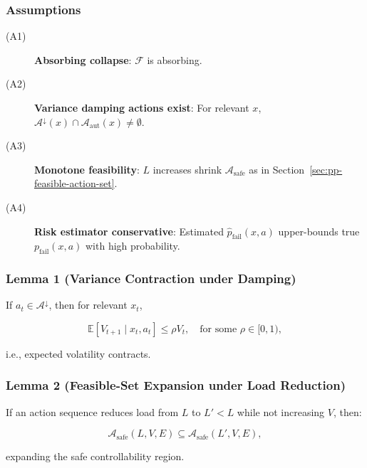 \subsubsection{Assumptions}
\label{sec:pp-assumptions}

\begin{description}
\item[(A1)] \textbf{Absorbing collapse}: $\mathcal{F}$ is absorbing.
\item[(A2)] \textbf{Variance damping actions exist}: For relevant
$x$, $\mathcal{A}^{\downarrow}(x) \cap
\mathcal{A}_{\mathrm{aut}}(x) \ne \emptyset$.
\item[(A3)] \textbf{Monotone feasibility}: $L$ increases shrink
$\mathcal{A}_{\mathrm{safe}}$ as in
Section~\ref{sec:pp-feasible-action-set}.
\item[(A4)] \textbf{Risk estimator conservative}: Estimated
$\widehat{p}_{\mathrm{fail}}(x, a)$ upper-bounds true
$p_{\mathrm{fail}}(x, a)$ with high probability.
\end{description}

\subsubsection{Lemma 1 (Variance Contraction under Damping)}
\label{sec:pp-lemma-1}

\begin{lemma}
\label{lem:pp-variance-contraction}
If $a_t \in \mathcal{A}^{\downarrow}$, then for relevant $x_t$,

\begin{equation}
\mathbb{E}[V_{t+1} \mid x_t, a_t] \le \rho V_t,
\quad \text{for some } \rho \in [0, 1),
\end{equation}

\noindent
i.e., expected volatility contracts.
\end{lemma}

\subsubsection{Lemma 2 (Feasible-Set Expansion under Load
Reduction)}
\label{sec:pp-lemma-2}

\begin{lemma}
\label{lem:pp-feasible-expansion}
If an action sequence reduces load from $L$ to $L' < L$ while not
increasing $V$, then:

\begin{equation}
\mathcal{A}_{\mathrm{safe}}(L, V, E) \subseteq
\mathcal{A}_{\mathrm{safe}}(L', V, E),
\end{equation}

\noindent
expanding the safe controllability region.
\end{lemma}

